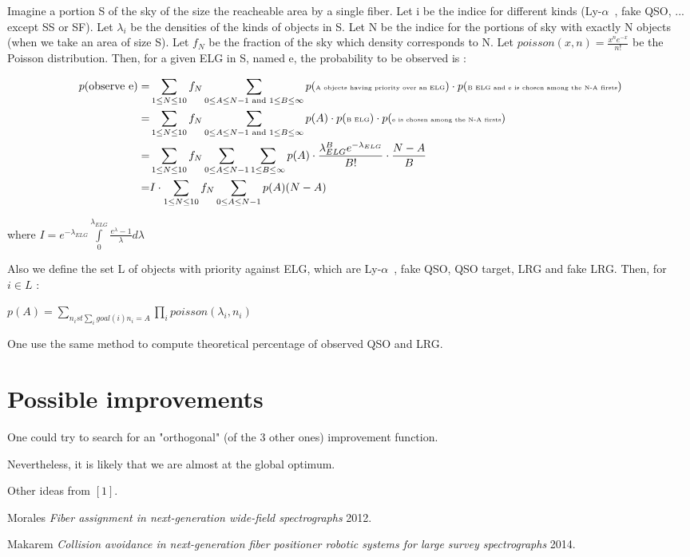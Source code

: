 \documentclass{article}
\def\lya{Ly-$\alpha$\ }
\begin{document}
Imagine a portion S of the sky of the size the reacheable area by a single fiber. Let i be the indice for different kinds (\lya, fake QSO, ... except SS or SF). Let $\lambda_{i}$ be the densities of the kinds of objects in S. Let N be the indice for the portions of sky with exactly N objects (when we take an area of size S). Let $f_{N}$ be the fraction of the sky which density corresponds to N. Let $poisson(x,n) = \frac{x^{n}e^{-x}}{n\text{!}}$ be the Poisson distribution. Then, for a given ELG in S, named e, the probability to be observed is :

	\begin{equation}
\begin{split} 
	p(\text{observe e}) =& \sum\limits_{1 \le N \le 10} f_{N} \sum\limits_{0 \le A \le N-1\text{ and }1 \le B \le \infty} p(\text{\tiny A objects having priority over an ELG}) \cdot p(\text{\tiny B ELG and e is chosen among the N-A firsts})\\
	=& \sum\limits_{1 \le N \le 10} f_{N} \sum\limits_{0 \le A \le N-1\text{ and }1 \le B \le \infty} p(A) \cdot p(\text{\tiny B ELG}) \cdot p(\text{\tiny e is chosen among the N-A firsts})\\
	=& \sum\limits_{1 \le N \le 10} f_{N} \sum\limits_{0 \le A \le N-1} \sum\limits_{1 \le B \le \infty} p(A) \cdot \frac{\lambda_{ELG}^{B}e^{-\lambda_{ELG}}}{B\text{!}} \cdot \frac{N-A}{B}\\
	=& I\cdot\sum\limits_{1 \le N \le 10} f_{N} \sum\limits_{0 \le A \le N-1} p(A) (N-A)
\end{split} 
	\end{equation}

	where $I = e^{-\lambda_{ELG}} \int\limits_{0}^{\lambda_{ELG}} \frac{e^{\lambda}-1}{\lambda} d\lambda$ 
	
	Also we define the set L of objects with priority against ELG, which are \lya, fake QSO, QSO target, LRG and fake LRG. Then, for $i \in L$ :
	
	$p(A) = \sum\limits_{n_{i} st \sum\limits_{i} goal(i)n_{i} = A} \prod\limits_{i} poisson(\lambda_{i},n_{i})$

	One use the same method to compute theoretical percentage of observed QSO and LRG.

\section{Possible improvements}
One could try to search for an "orthogonal" (of the 3 other ones) improvement function.

Nevertheless, it is likely that we are almost at the global optimum.

Other ideas from $[1]$.




  \begin{thebibliography}{1}

   Morales {\em Fiber assignment in next-generation wide-field spectrographs}  2012.

   Makarem {\em Collision avoidance in next-generation fiber positioner robotic systems for large survey spectrographs}  2014.

  \end{thebibliography}
\end{document}
